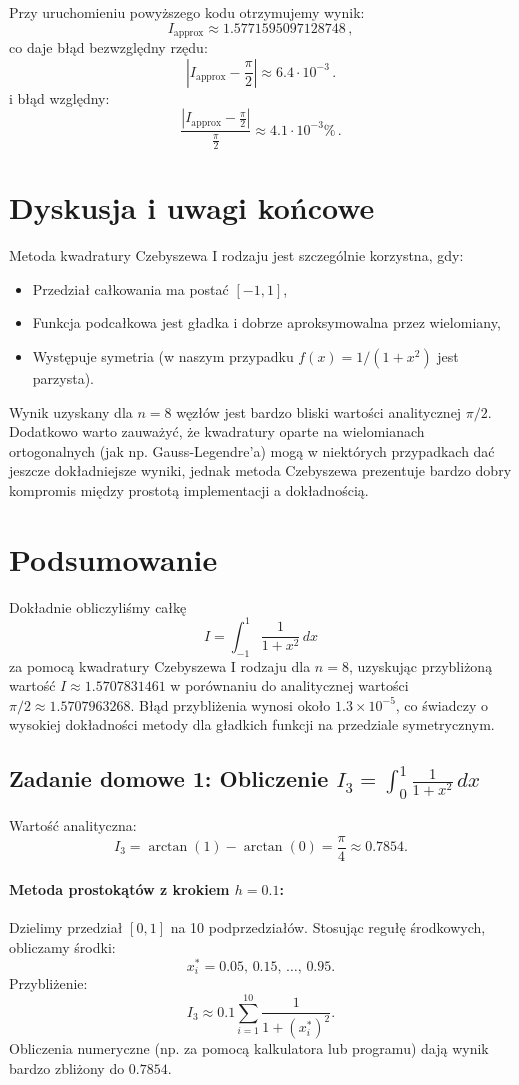 \documentclass[a4paper,12pt]{article}
\begin{document}
Przy uruchomieniu powyższego kodu otrzymujemy wynik:
\[
I_{\text{approx}} \approx 1.5771595097128748 \,,
\]
co daje błąd bezwzględny rzędu:
\[
\left| I_{\text{approx}} - \frac{\pi}{2} \right| \approx 6.4 \cdot 10^{-3}\,.
\]
i błąd względny:
\[
\frac{\left| I_{\text{approx}} - \frac{\pi}{2} \right|}{\frac{\pi}{2}}  \approx 4.1 \cdot 10^{-3} \%\,.
\]


\section{Dyskusja i uwagi końcowe}
Metoda kwadratury Czebyszewa I rodzaju jest szczególnie korzystna, gdy:
\begin{itemize}
  \item Przedział całkowania ma postać \([-1,1]\),
  \item Funkcja podcałkowa jest gładka i dobrze aproksymowalna przez wielomiany,
  \item Występuje symetria (w naszym przypadku \(f(x)=1/(1+x^2)\) jest parzysta).
\end{itemize}

Wynik uzyskany dla \(n = 8\) węzłów jest bardzo bliski wartości analitycznej \(\pi/2\). Dodatkowo warto zauważyć, że kwadratury oparte na wielomianach ortogonalnych (jak np. Gauss-Legendre'a) mogą w niektórych przypadkach dać jeszcze dokładniejsze wyniki, jednak metoda Czebyszewa prezentuje bardzo dobry kompromis między prostotą implementacji a dokładnością.

\section{Podsumowanie}
Dokładnie obliczyliśmy całkę
\[
I=\int_{-1}^{1}\frac{1}{1+x^2}\,dx
\]
za pomocą kwadratury Czebyszewa I rodzaju dla \(n = 8\), uzyskując przybliżoną wartość \(I \approx 1.5707831461\) w porównaniu do analitycznej wartości \(\pi/2 \approx 1.5707963268\). Błąd przybliżenia wynosi około \(1.3 \times 10^{-5}\), co świadczy o wysokiej dokładności metody dla gładkich funkcji na przedziale symetrycznym.

\subsection*{Zadanie domowe 1: Obliczenie \(\displaystyle I_3=\int_{0}^{1}\frac{1}{1+x^2}\,dx\)}
Wartość analityczna:
\[
I_3=\arctan(1)-\arctan(0)=\frac{\pi}{4}\approx 0.7854.
\]

\paragraph{Metoda prostokątów z krokiem \(h=0.1\):}
Dzielimy przedział \([0,1]\) na 10 podprzedziałów. Stosując regułę środkowych, obliczamy środki:
\[
x_i^* = 0.05,\, 0.15,\, \dots,\, 0.95.
\]
Przybliżenie:
\[
I_3 \approx 0.1 \sum_{i=1}^{10} \frac{1}{1+(x_i^*)^2}.
\]
Obliczenia numeryczne (np. za pomocą kalkulatora lub programu) dają wynik bardzo zbliżony do \(0.7854\).
\end{document}

